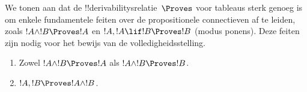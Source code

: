 \documentclass[openany]{memoir}
\begin{document}
\begingroup
\def\olfilename{OLP-0107}
\def\olfilepath{content/first-order-logic/tableaux/}
\hypertarget{unit-OLP-0107}{}




      {}
      {}


\begin{explain}
  We tonen aan dat de !!{derivability}srelatie~$\Proves$ voor
  tableaus sterk genoeg is om enkele fundamentele feiten over de
  propositionele connectieven af te leiden, zoals
  $!A \land !B \Proves !A$ en $!A, !A \lif !B \Proves !B$ (modus
  ponens). Deze feiten zijn nodig voor het bewijs van de
  volledigheidsstelling.
\end{explain}

\begin{prop}
  \begin{enumerate}
  \item {} Zowel $!A \land !B \Proves
    !A$ als $!A \land !B \Proves !B$.
  \item {} $!A, !B \Proves !A \land
    !B$.
  \end{enumerate}
\end{prop}
\end{document}
